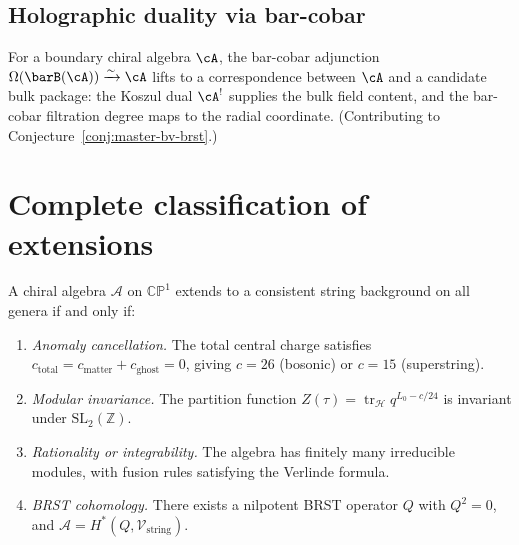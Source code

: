\subsection{Holographic duality via bar-cobar}

\begin{conjecture}
\label{conj:bulk-boundary-correspondence}
For a boundary chiral algebra $\cA$, the bar-cobar adjunction
$\Omega(\barB(\cA)) \xrightarrow{\sim} \cA$ lifts to a correspondence
between $\cA$ and a candidate bulk package: the Koszul dual $\cA^!$
supplies the bulk field content, and the bar-cobar filtration degree
maps to the radial coordinate.
(Contributing to Conjecture~\ref{conj:master-bv-brst}.)
\end{conjecture}

\section{Complete classification of extensions}

\begin{theorem}\label{thm:classification-extendable}
A chiral algebra $\mathcal{A}$ on $\mathbb{CP}^1$ extends to a consistent string background on all genera if and only if:
\begin{enumerate}
\item \emph{Anomaly cancellation.} The total central charge satisfies $c_{\mathrm{total}} = c_{\mathrm{matter}} + c_{\mathrm{ghost}} = 0$, giving $c = 26$ (bosonic) or $c = 15$ (superstring).
\item \emph{Modular invariance.} The partition function $Z(\tau) = \operatorname{tr}_{\mathcal{H}} q^{L_0 - c/24}$ is invariant under $\mathrm{SL}_2(\mathbb{Z})$.
\item \emph{Rationality or integrability.} The algebra has finitely many irreducible modules, with fusion rules satisfying the Verlinde formula.
\item \emph{BRST cohomology.} There exists a nilpotent BRST operator $Q$ with $Q^2 = 0$, and $\mathcal{A} = H^*(Q, \mathcal{V}_{\mathrm{string}})$.
\end{enumerate}
\end{theorem}

